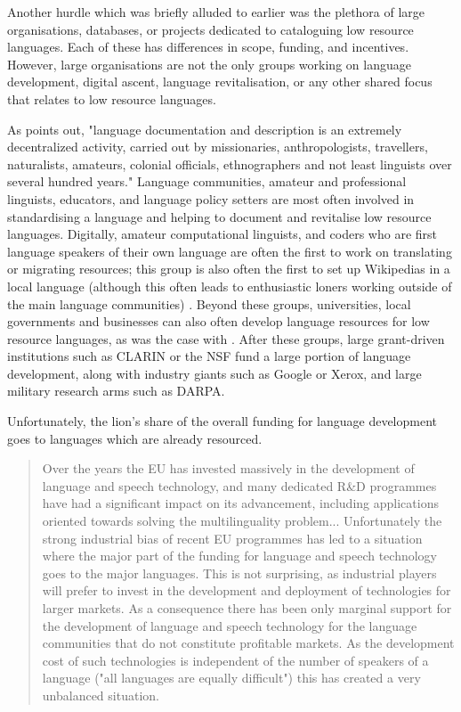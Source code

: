 Another hurdle which was briefly alluded to earlier was the plethora of large organisations, databases, or projects dedicated to cataloguing low resource languages. Each of these has differences in scope, funding, and incentives. However, large organisations are not the only groups working on language development, digital ascent, language revitalisation, or any other shared focus that relates to low resource languages.

As \citet{hammarstrom2015unesco} points out, "language documentation and description is an extremely decentralized activity, carried out by missionaries, anthropologists, travellers, naturalists, amateurs, colonial officials, ethnographers and not least linguists over several hundred years." Language communities, amateur and professional linguists, educators, and language policy setters are most often involved in standardising a language and helping to document and revitalise low resource languages. Digitally, amateur computational linguists, and coders who are first language speakers of their own language are often the first to work on translating or migrating resources; this group is also often the first to set up Wikipedias in a local language (although this often leads to enthusiastic loners working outside of the main language communities) \citet{soria2017digital}. Beyond these groups, universities, local governments and businesses can also often develop language resources for low resource languages, as was the case with \citet{rognvaldsson2009icelandic}. After these groups, large grant-driven institutions such as CLARIN or the NSF fund a large portion of language development, along with industry giants such as Google or Xerox, and large military research arms such as DARPA.

Unfortunately, the lion's share of the overall funding for language development goes to languages which are already resourced.

\begin{quote}
Over the years the EU has invested massively in the development of language and speech technology, and many dedicated R\&D programmes have had a significant impact on its advancement, including applications oriented towards solving the multilinguality problem... Unfortunately the strong industrial bias of recent EU programmes has led to a situation where the major part of the funding for language and speech technology goes to the major languages. This is not surprising, as industrial players will prefer to invest in the development and deployment of technologies for larger markets. As a consequence there has been only marginal support for the development of language and speech technology for the language communities that do not constitute profitable markets. As the development cost of such technologies is independent of the number of speakers of a language ("all languages are equally difficult") this has created a very unbalanced situation. \citep{krauwer2006strengthening}
\end{quote}

